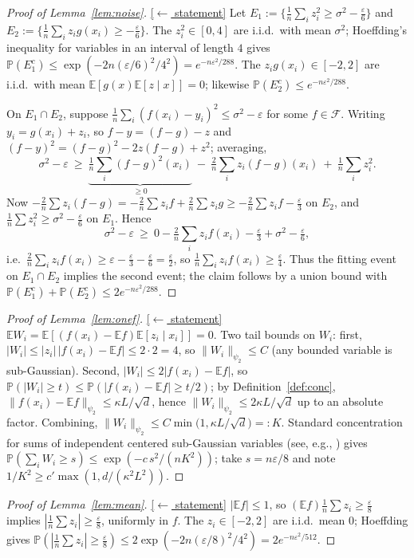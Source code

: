 \documentclass[11pt,reqno]{amsart}
\theoremstyle{plain}
\theoremstyle{definition}
\theoremstyle{remark}
\newcommand{\PP}{\mathbb{P}}
\newcommand{\EE}{\mathbb{E}}
\newcommand{\eps}{\varepsilon}
\newcommand{\FF}{\mathcal{F}}
\newcommand{\stmtbutton}[1]{\hyperref[#1]{\textnormal{\footnotesize\textsf{[$\leftarrow$ statement]}}}}
\begin{document}
\begin{proof}[Proof of Lemma~\textup{\ref{lem:noise}}]\label{proof:noise}\stmtbutton{lem:noise}
Let $E_1:=\{\tfrac1n\sum_i z_i^2\ge\sigma^2-\tfrac\eps6\}$ and $E_2:=\{\tfrac1n\sum_i z_ig(x_i)\ge-\tfrac\eps6\}$. The $z_i^2\in[0,4]$ are i.i.d.\ with mean $\sigma^2$; Hoeffding's inequality \cite[Thm.~2.2.6]{Vershynin} for variables in an interval of length $4$ gives $\PP(E_1^c)\le\exp(-2n(\eps/6)^2/4^2)=e^{-n\eps^2/288}$. The $z_ig(x_i)\in[-2,2]$ are i.i.d.\ with mean $\EE[g(x)\EE[z\mid x]]=0$; likewise $\PP(E_2^c)\le e^{-n\eps^2/288}$.

On $E_1\cap E_2$, suppose $\tfrac1n\sum_i(f(x_i)-y_i)^2\le\sigma^2-\eps$ for some $f\in\FF$. Writing $y_i=g(x_i)+z_i$, so $f-y=(f-g)-z$ and $(f-y)^2=(f-g)^2-2z(f-g)+z^2$; averaging,
\[
\sigma^2-\eps\ \ge\ \underbrace{\tfrac1n\textstyle\sum_i(f-g)^2(x_i)}_{\ge0}\ -\ \tfrac2n\textstyle\sum_i z_i(f-g)(x_i)\ +\ \tfrac1n\textstyle\sum_i z_i^2 .
\]
Now $-\tfrac2n\sum z_i(f-g)=-\tfrac2n\sum z_i f+\tfrac2n\sum z_i g\ge-\tfrac2n\sum z_i f-\tfrac\eps3$ on $E_2$, and $\tfrac1n\sum z_i^2\ge\sigma^2-\tfrac\eps6$ on $E_1$. Hence
\[
\sigma^2-\eps\ \ge\ 0-\tfrac2n\textstyle\sum_i z_if(x_i)-\tfrac\eps3+\sigma^2-\tfrac\eps6,
\]
i.e.\ $\tfrac2n\sum_i z_if(x_i)\ge\eps-\tfrac\eps3-\tfrac\eps6=\tfrac\eps2$, so $\tfrac1n\sum_i z_if(x_i)\ge\tfrac\eps4$. Thus the fitting event on $E_1\cap E_2$ implies the second event; the claim follows by a union bound with $\PP(E_1^c)+\PP(E_2^c)\le2e^{-n\eps^2/288}$.
\end{proof}

\begin{proof}[Proof of Lemma~\textup{\ref{lem:onef}}]\label{proof:onef}\stmtbutton{lem:onef}
$\EE W_i=\EE[(f(x_i)-\EE f)\EE[z_i\mid x_i]]=0$. Two tail bounds on $W_i$: first, $|W_i|\le|z_i|\,|f(x_i)-\EE f|\le2\cdot2=4$, so $\|W_i\|_{\psi_2}\le C$ (any bounded variable is sub-Gaussian). Second, $|W_i|\le2|f(x_i)-\EE f|$, so $\PP(|W_i|\ge t)\le\PP(|f(x_i)-\EE f|\ge t/2)$; by Definition~\ref{def:conc}, $\|f(x_i)-\EE f\|_{\psi_2}\le\kappa L/\sqrt d$, hence $\|W_i\|_{\psi_2}\le 2\kappa L/\sqrt d$ up to an absolute factor. Combining, $\|W_i\|_{\psi_2}\le C\min\bigl(1,\kappa L/\sqrt d\bigr)=:K$. Standard concentration for sums of independent centered sub-Gaussian variables (see, e.g., \cite[Ch.~2]{Vershynin}) gives $\PP(\sum_i W_i\ge s)\le\exp(-c\,s^2/(nK^2))$; take $s=n\eps/8$ and note $1/K^2\ge c'\max(1,d/(\kappa^2L^2))$.
\end{proof}

\begin{proof}[Proof of Lemma~\textup{\ref{lem:mean}}]\label{proof:mean}\stmtbutton{lem:mean}
$|\EE f|\le1$, so $(\EE f)\tfrac1n\sum z_i\ge\tfrac\eps8$ implies $|\tfrac1n\sum z_i|\ge\tfrac\eps8$, uniformly in $f$. The $z_i\in[-2,2]$ are i.i.d.\ mean $0$; Hoeffding gives $\PP(|\tfrac1n\sum z_i|\ge\tfrac\eps8)\le2\exp(-2n(\eps/8)^2/4^2)=2e^{-n\eps^2/512}$.
\end{proof}
\end{document}
